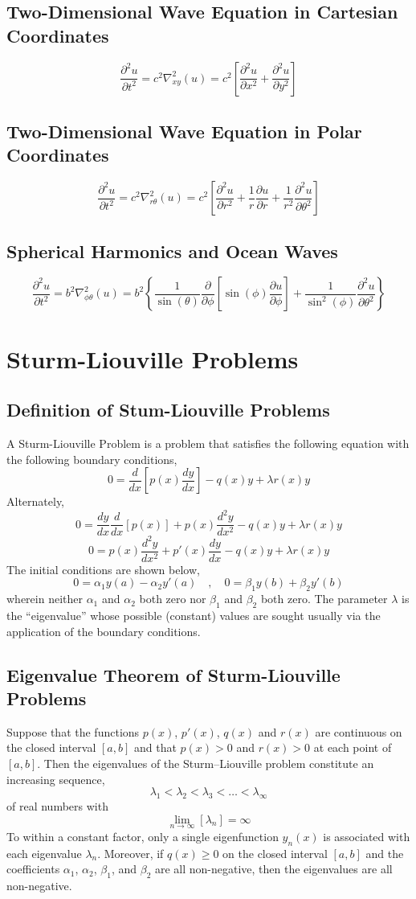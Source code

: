 \documentclass[a4paper, 12pt]{report}
\def\t{\theta}
\def\a{\alpha}
\def\be{\beta}
\def\la{\lambda}
\def\f{\frac}
\def\l{\left}
\def\r{\right}
\def\ph{\phi}
\def\p{\partial}
\let\stdsection\section
\renewcommand\section{\newpage\stdsection}
\begin{document}
\begin{center}
\subsection{Two-Dimensional Wave Equation in Cartesian Coordinates}
$$\f{\p^2u}{\p t^2} = c^2\nabla^2_{xy}(u) = c^2\l[\f{\p^2u}{\p x^2} + \f{\p^2u}{\p y^2}\r]$$
\subsection{Two-Dimensional Wave Equation in Polar Coordinates}
$$\f{\p^2u}{\p t^2} = c^2\nabla^2_{r\t}(u) = c^2\l[\f{\p^2u}{\p r^2} + \f{1}{r}\f{\p u}{\p r} + \f{1}{r^2}\f{\p^2u}{\p \t^2}\r]$$
\subsection{Spherical Harmonics and Ocean Waves}
$$\f{\p^2u}{\p t^2} = b^2\nabla^2_{\ph\t}(u) = b^2\l\{\f{1}{\sin(\t)}\f{\p}{\p \ph}\l[\sin(\ph)\f{\p u}{\p \ph}\r] + \f{1}{\sin^2(\ph)}\f{\p^2u}{\p \t^2}\r\}$$
\section{Sturm-Liouville Problems}
\begin{comment}
\end{comment}
\subsection{Definition of Stum-Liouville Problems}
A Sturm-Liouville Problem is a problem that satisfies the following equation with the following boundary conditions,
$$0 = \f{d}{dx}\l[p(x)\f{dy}{dx}\r]-q(x)y+\la r(x)y$$
Alternately,
$$0 = \f{dy}{dx}\f{d}{dx}\l[p(x)\r] + p(x)\f{d^2y}{dx^2}-q(x)y+\la r(x)y$$
$$0 = p(x)\f{d^2y}{dx^2} + p'(x)\f{dy}{dx}-q(x)y+\la r(x)y$$
The initial conditions are shown below,
$$0 = \a_1y(a) - \a_2y'(a)\quad,\quad 0 = \be_1y(b) + \be_2y'(b)$$
wherein neither $\a_1$ and $\a_2$ both zero nor $\be_1$ and $\be_2$ both zero. The parameter $\la$ is the “eigenvalue” whose possible (constant) values are sought usually via the application of the boundary conditions.
\subsection{Eigenvalue Theorem of Sturm-Liouville Problems}
Suppose that the functions $p(x)$, $p'(x)$, $q(x)$ and $r(x)$ are continuous
on the closed interval $[a,b]$ and that $p(x)>0$ and $r(x)>0$ at each point of $[a,b]$. Then the eigenvalues of the Sturm–Liouville problem constitute an increasing sequence,
$$\la_1 < \la_2 < \la_3 < \dots <\la_\infty$$
of real numbers with
$$\lim_{n\to\infty}[\la_n] = \infty$$
To within a constant factor, only a single eigenfunction $y_n(x)$ is associated with each eigenvalue $\la_n$. Moreover, if $q(x)\geq0$ on the closed interval $[a,b]$ and the coefficients $\a_1$, $\a_2$, $\be_1$, and $\be_2$ are all non-negative, then the eigenvalues are all non-negative.

\end{center}
\end{document}
